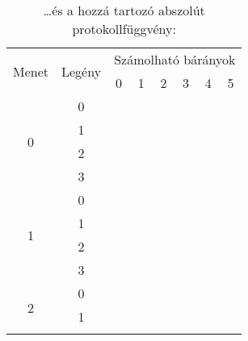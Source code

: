\documentclass{article}
\newcommand{\blk}{\cellcolor{darkgray}}
\newcommand{\red}{\cellcolor{red!33}}
\newcommand{\grn}{\cellcolor{green!33}}
\newcommand{\nothing}{\text{\raisebox{0.4em}{\rotatebox{180}{$\curvearrowleft$}}}}%
\newcommand{\just}[1]{\boxed{#1}}%
\newcommand{\incl}{\mathbf{incl}}
\newcommand{\excl}{\mathbf{excl}}
\begin{document}
	\begin{table}[H]
		\caption*{\dots és a hozzá tartozó abszolút protokollfüggvény:}
		\centering
		\begin{tabular}{c|c|c|c|c|c|c|c|}
			\multirow{2}{*}{Menet} &  \multirow{2}{*}{Legény}  &    \multicolumn{6}{c|}{Számolható bárányok}                                                          \\
				               &                           &    0              & 1              & 2              & 3              & 4              & 5              \\\hline\hline
			\multirow{4}{*}{0}     &  0                        &    \nothing       & \nothing       & \nothing       & \nothing       & \nothing       & \grn\just\incl \\\cline{2-8}
				               &  1                        &    \nothing       & \nothing       & \nothing       & \nothing       & \nothing       & \grn\just\incl \\\cline{2-8}
				               &  2                        &    \red\just\excl & \nothing       & \nothing       & \nothing       & \nothing       & \grn\just\incl \\\cline{2-8}
				               &  3                        &    \red\just\excl & \nothing       & \nothing       & \nothing       & \nothing       & \grn\just\incl \\\hline\hline
			\multirow{4}{*}{1}     &  0                        &    \red\just\excl & \nothing       & \nothing       & \nothing       & \grn\just\incl & \blk           \\\cline{2-8}
				               &  1                        &    \red\just\excl & \nothing       & \nothing       & \nothing       & \grn\just\incl & \blk           \\\cline{2-8}
				               &  2                        &    \blk           & \red\just\excl & \nothing       & \nothing       & \grn\just\incl & \blk           \\\cline{2-8}
				               &  3                        &    \blk           & \red\just\excl & \nothing       & \nothing       & \grn\just\incl & \blk           \\\hline\hline
			\multirow{4}{*}{2}     &  0                        &    \blk           & \red\just\excl & \nothing       & \grn\just\incl & \blk           & \blk           \\\cline{2-8}
				               &  1                        &    \blk           & \red\just\excl & \nothing       & \grn\just\incl & \blk           & \blk           \\\cline{2-8}

\end{tabular}
\end{table}
\end{document}
